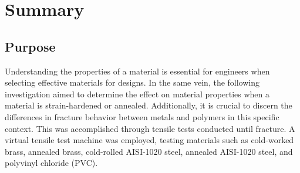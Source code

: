 \documentclass[11pt]{article}
\begin{document}
    
    
    \tableofcontents
    \newpage

    \section{Summary}
        \subsection{Purpose}
            Understanding the properties of a material is essential for engineers when selecting effective materials for designs. 
            In the same vein, the following investigation aimed to determine the effect on material properties when a material is strain-hardened or annealed. 
            Additionally, it is crucial to discern the differences in fracture behavior between metals and polymers in this specific context. 
            This was accomplished through tensile tests conducted until fracture. 
            A virtual tensile test machine was employed, testing materials such as cold-worked brass, annealed brass, cold-rolled AISI-1020 steel, annealed AISI-1020 steel, and polyvinyl chloride (PVC).
\end{document}
